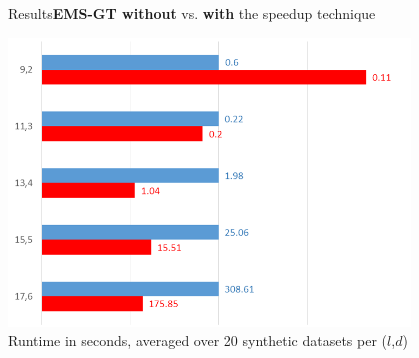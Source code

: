 \documentclass[pdf,xcolor={dvipsnames}]{beamer}
\begin{document}
	\begin{frame}{Results}{{\bf EMS-GT \color{blue}without} vs. {\bf\color{red}with} the speedup technique\\} %

		{\centering
		\includegraphics[width=0.8\textwidth]{img/results1.png}\\
		\footnotesize Runtime in seconds, averaged over 20 synthetic datasets per ($l$,$d$) \\}
		\end{frame}
\end{document}
